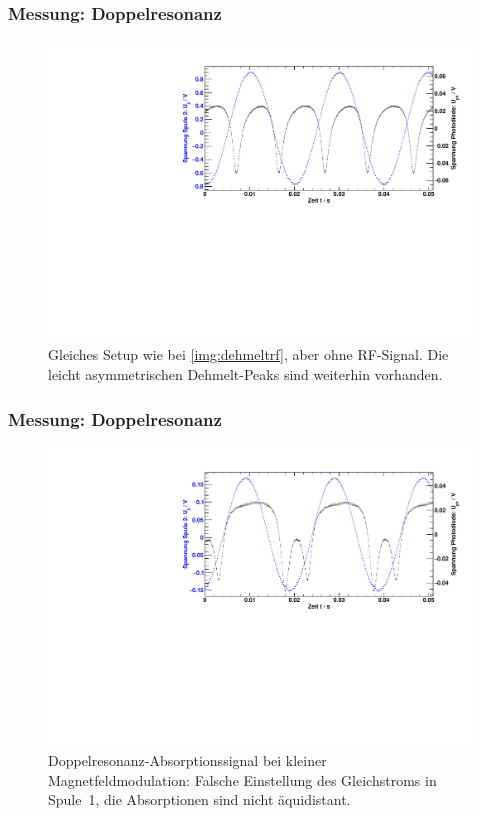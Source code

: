 \begin{frame}
\frametitle{Messung: Doppelresonanz}
\begin{figure}
\begin{center}
    \includegraphics[width=\textwidth]{../img/07.pdf}
    \caption{Gleiches Setup wie bei \autoref{img:dehmeltrf}, aber ohne RF-Signal.
    Die leicht asymmetrischen Dehmelt-Peaks sind weiterhin vorhanden.}
    \label{img:dehmelt}
\end{center}
\end{figure}
\end{frame}

\begin{frame}
\frametitle{Messung: Doppelresonanz}
\begin{figure}
\begin{center}
  \includegraphics[width=\textwidth]{../img/11.pdf}
  \caption{Doppelresonanz-Absorptionssignal bei kleiner Magnetfeldmodulation:
  Falsche Einstellung des Gleichstroms in Spule~1,
  die Absorptionen sind nicht äquidistant.}
  \label{img:rfwrong}
\end{center}
\end{figure}
\end{frame}

